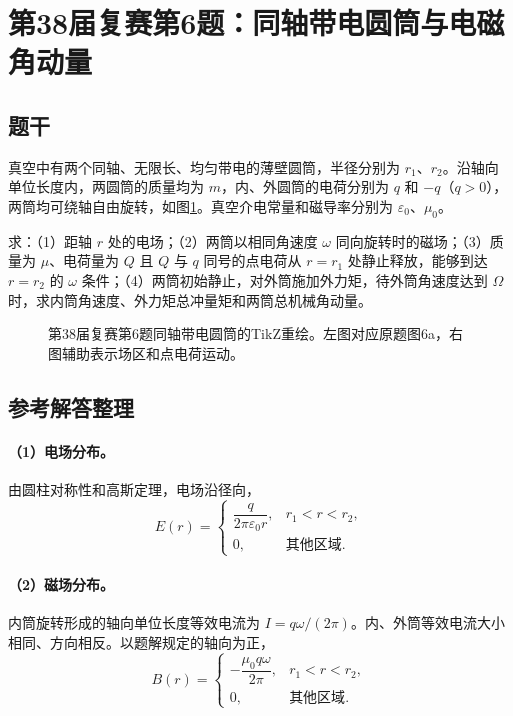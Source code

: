 \section{第38届复赛第6题：同轴带电圆筒与电磁角动量}

\subsection{题干}
真空中有两个同轴、无限长、均匀带电的薄壁圆筒，半径分别为 $r_1$、$r_2$。沿轴向单位长度内，两圆筒的质量均为 $m$，内、外圆筒的电荷分别为 $q$ 和 $-q$（$q>0$），两筒均可绕轴自由旋转，如图\ref{fig:cpho38q06}。真空介电常量和磁导率分别为 $\varepsilon_0$、$\mu_0$。

求：（1）距轴 $r$ 处的电场；（2）两筒以相同角速度 $\omega$ 同向旋转时的磁场；（3）质量为 $\mu$、电荷量为 $Q$ 且 $Q$ 与 $q$ 同号的点电荷从 $r=r_1$ 处静止释放，能够到达 $r=r_2$ 的 $\omega$ 条件；（4）两筒初始静止，对外筒施加外力矩，待外筒角速度达到 $\Omega$ 时，求内筒角速度、外力矩总冲量矩和两筒总机械角动量。
\begin{figure}[htbp]
  \centering
  
  \caption{第38届复赛第6题同轴带电圆筒的TikZ重绘。左图对应原题图6a，右图辅助表示场区和点电荷运动。}
  \label{fig:cpho38q06}
\end{figure}

\subsection{参考解答整理}
\paragraph{（1）电场分布。}
由圆柱对称性和高斯定理，电场沿径向，
\[
\boxed{
E(r)=
\begin{cases}
\dfrac{q}{2\pi\varepsilon_0r},&r_1<r<r_2,\\[4pt]
0,&\text{其他区域}.
\end{cases}}
\]

\paragraph{（2）磁场分布。}
内筒旋转形成的轴向单位长度等效电流为 $I=q\omega/(2\pi)$。内、外筒等效电流大小相同、方向相反。以题解规定的轴向为正，
\[
\boxed{
B(r)=
\begin{cases}
-\dfrac{\mu_0q\omega}{2\pi},&r_1<r<r_2,\\[4pt]
0,&\text{其他区域}.
\end{cases}}
\]

